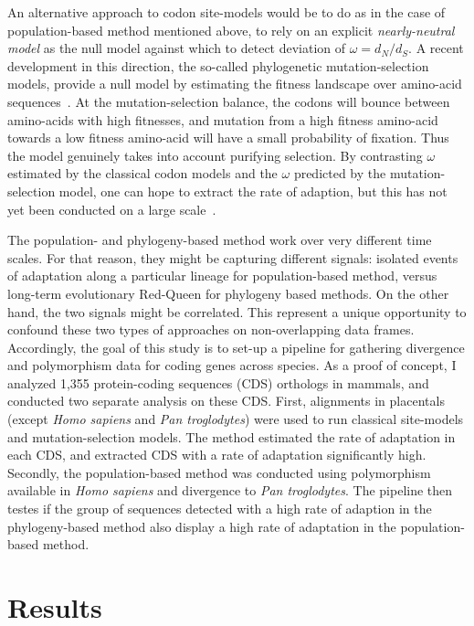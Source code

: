 \documentclass{article}
\begin{document}
An alternative approach to codon site-models would be to do as in the case of population-based method mentioned above, to rely on an explicit \textit{nearly-neutral model} as the null model against which to detect deviation of $\omega=d_N/d_S$.
A recent development in this direction, the so-called phylogenetic mutation-selection models, provide a null model by estimating the fitness landscape over amino-acid sequences~\citep{Yang2008, Halpern1998, Rodrigue2010}.
At the mutation-selection balance, the codons will bounce between amino-acids with high fitnesses, and mutation from a high fitness amino-acid towards a low fitness amino-acid will have a small probability of fixation.
Thus the model genuinely takes into account purifying selection.
By contrasting $\omega$ estimated by the classical codon models and the $\omega$ predicted by the mutation-selection model, one can hope to extract the rate of adaption, but this has not yet been conducted on a large scale~\citep{Rodrigue2016}.

The population- and phylogeny-based method work over very different time scales.
For that reason, they might be capturing different signals: isolated events of adaptation along a particular lineage for population-based method, versus long-term evolutionary Red-Queen for phylogeny based methods.
On the other hand, the two signals might be correlated.
This represent a unique opportunity to confound these two types of approaches on non-overlapping data frames.
Accordingly, the goal of this study is to set-up a pipeline for gathering divergence and polymorphism data for coding genes across species.
As a proof of concept, I analyzed 1,355 protein-coding sequences (CDS) orthologs in mammals, and conducted two separate analysis on these CDS.
First, alignments in placentals (except \textit{Homo sapiens} and \textit{Pan troglodytes}) were used to run classical site-models and mutation-selection models.
The method estimated the rate of adaptation in each CDS, and extracted CDS with a rate of adaptation significantly high.
Secondly, the population-based method was conducted using polymorphism available in \textit{Homo sapiens} and divergence to \textit{Pan troglodytes}.
The pipeline then testes if the group of sequences detected with a high rate of adaption in the phylogeny-based method also display a high rate of adaptation in the population-based method.

\section*{Results}
\end{document}
